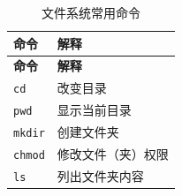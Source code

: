 \documentclass[doctor,openright,twoside]{sjtuthesis}
\newcommand{\passthrough}[1]{#1}
\theoremstyle{plain}
\theoremstyle{definition}
\theoremstyle{remark}
\theoremstyle{ocrenumbox}
\theoremstyle{plain}
\begin{document}
\begin{longtable}[]{@{}ll@{}}
\caption{文件系统常用命令}\tabularnewline
\toprule
\begin{minipage}[b]{0.16\columnwidth}\raggedright
\textbf{命令}\strut
\end{minipage} & \begin{minipage}[b]{0.78\columnwidth}\raggedright
\textbf{解释}\strut
\end{minipage}\tabularnewline
\midrule
\endfirsthead
\toprule
\begin{minipage}[b]{0.16\columnwidth}\raggedright
\textbf{命令}\strut
\end{minipage} & \begin{minipage}[b]{0.78\columnwidth}\raggedright
\textbf{解释}\strut
\end{minipage}\tabularnewline
\midrule
\endhead
\begin{minipage}[t]{0.16\columnwidth}\raggedright
\passthrough{\lstinline!cd!}\strut
\end{minipage} & \begin{minipage}[t]{0.78\columnwidth}\raggedright
改变目录\strut
\end{minipage}\tabularnewline
\begin{minipage}[t]{0.16\columnwidth}\raggedright
\passthrough{\lstinline!pwd!}\strut
\end{minipage} & \begin{minipage}[t]{0.78\columnwidth}\raggedright
显示当前目录\strut
\end{minipage}\tabularnewline
\begin{minipage}[t]{0.16\columnwidth}\raggedright
\passthrough{\lstinline!mkdir!}\strut
\end{minipage} & \begin{minipage}[t]{0.78\columnwidth}\raggedright
创建文件夹\strut
\end{minipage}\tabularnewline
\begin{minipage}[t]{0.16\columnwidth}\raggedright
\passthrough{\lstinline!chmod!}\strut
\end{minipage} & \begin{minipage}[t]{0.78\columnwidth}\raggedright
修改文件（夹）权限\strut
\end{minipage}\tabularnewline
\begin{minipage}[t]{0.16\columnwidth}\raggedright
\passthrough{\lstinline!ls!}\strut
\end{minipage} & \begin{minipage}[t]{0.78\columnwidth}\raggedright
列出文件夹内容\strut
\end{minipage}\tabularnewline
\bottomrule
\end{longtable}
\end{document}
